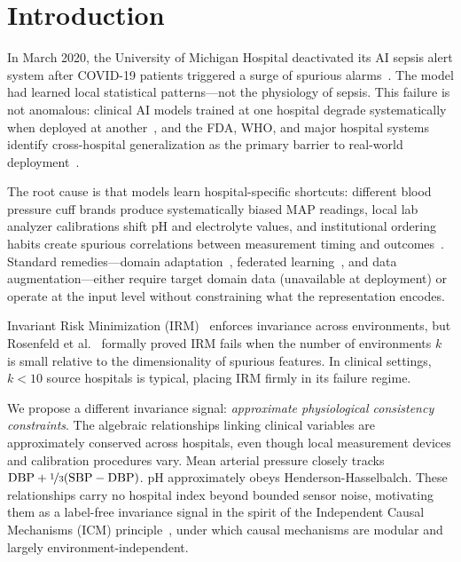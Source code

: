 \documentclass{article}
\begin{document}
\section{Introduction}
\label{sec:intro}

In March 2020, the University of Michigan Hospital deactivated its AI sepsis alert system after COVID-19 patients triggered a surge of spurious alarms~\citep{wong2021external}.
The model had learned local statistical patterns---not the physiology of sepsis.
This failure is not anomalous: clinical AI models trained at one hospital degrade systematically when deployed at another~\citep{zech2018variable, futoma2020myth, nestor2019feature}, and the FDA, WHO, and major hospital systems identify cross-hospital generalization as the primary barrier to real-world deployment~\citep{fda2021action}.

The root cause is that models learn hospital-specific shortcuts: different blood pressure cuff brands produce systematically biased MAP readings, local lab analyzer calibrations shift pH and electrolyte values, and institutional ordering habits create spurious correlations between measurement timing and outcomes~\citep{finlayson2021clinician}.
Standard remedies---domain adaptation~\citep{ganin2016domain}, federated learning~\citep{rieke2020future}, and data augmentation---either require target domain data (unavailable at deployment) or operate at the input level without constraining what the representation encodes.

Invariant Risk Minimization (IRM)~\citep{arjovsky2019invariant} enforces invariance across environments, but Rosenfeld et al.~\citep{rosenfeld2021risks} formally proved IRM fails when the number of environments $k$ is small relative to the dimensionality of spurious features.
In clinical settings, $k < 10$ source hospitals is typical, placing IRM firmly in its failure regime.

We propose a different invariance signal: \emph{approximate physiological consistency constraints}.
The algebraic relationships linking clinical variables are approximately conserved across hospitals, even though local measurement devices and calibration procedures vary.
Mean arterial pressure closely tracks $\text{DBP} + \nicefrac{1}{3}(\text{SBP} - \text{DBP})$.
pH approximately obeys Henderson-Hasselbalch.
These relationships carry no hospital index beyond bounded sensor noise, motivating them as a label-free invariance signal in the spirit of the Independent Causal Mechanisms (ICM) principle~\citep{scholkopf2021toward}, under which causal mechanisms are modular and largely environment-independent.
\end{document}
